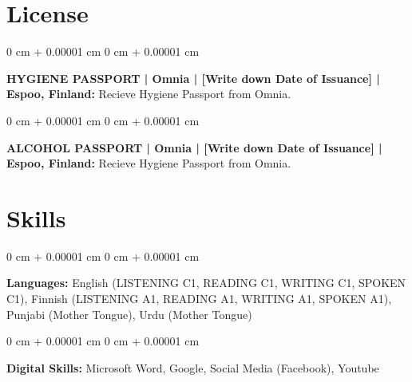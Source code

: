 \documentclass[10pt, a4paper]{article}
\newenvironment{onecolentry}{
    \begin{adjustwidth}{
        0 cm + 0.00001 cm
    }{
        0 cm + 0.00001 cm
    }
}{
    \end{adjustwidth}
} %
\begin{document}
    
    \section{License}



        
        \begin{onecolentry}
            \textbf{HYGIENE PASSPORT | Omnia | [Write down Date of Issuance] | Espoo, Finland:} Recieve Hygiene Passport from Omnia.
        \end{onecolentry}

        \vspace{0.2 cm}

        \begin{onecolentry}
            \textbf{ALCOHOL PASSPORT | Omnia | [Write down Date of Issuance] | Espoo, Finland:} Recieve Hygiene Passport from Omnia.
        \end{onecolentry}


    
    \section{Skills}



        
        \begin{onecolentry}
            \textbf{Languages:} English (LISTENING C1, READING C1, WRITING C1, SPOKEN C1), Finnish (LISTENING A1, READING A1, WRITING A1, SPOKEN A1), Punjabi (Mother Tongue), Urdu (Mother Tongue)
        \end{onecolentry}

        \vspace{0.2 cm}

        \begin{onecolentry}
            \textbf{Digital Skills:} Microsoft Word, Google, Social Media (Facebook), Youtube
        \end{onecolentry}


    
\end{document}

